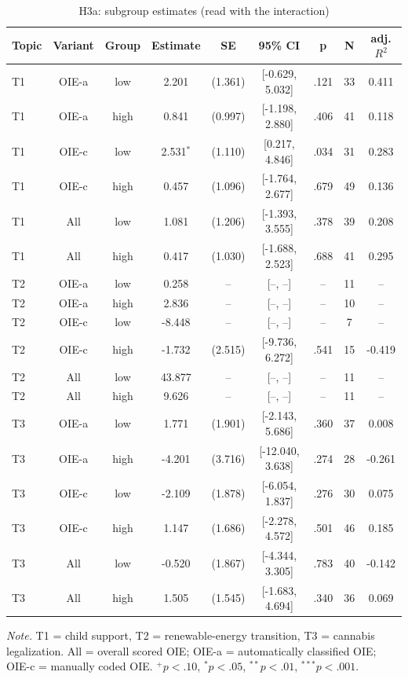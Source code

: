 \begin{table}[htbp]
\centering
\begin{threeparttable}
\caption{H3a: subgroup estimates (read with the interaction)}
\label{tab:tab_h3a_subgroups}
\begin{tabular}{lcccccccc}
\toprule
  Topic & Variant & Group & Estimate & SE & 95\% CI & p & N & adj. $R^2$ \\
\midrule
  T1 & OIE-a & low & 2.201 & (1.361) & [-0.629, 5.032] & .121 & 33 & 0.411 \\
  T1 & OIE-a & high & 0.841 & (0.997) & [-1.198, 2.880] & .406 & 41 & 0.118 \\
  T1 & OIE-c & low & 2.531$^{*}$ & (1.110) & [0.217, 4.846] & .034 & 31 & 0.283 \\
  T1 & OIE-c & high & 0.457 & (1.096) & [-1.764, 2.677] & .679 & 49 & 0.136 \\
  T1 & All & low & 1.081 & (1.206) & [-1.393, 3.555] & .378 & 39 & 0.208 \\
  T1 & All & high & 0.417 & (1.030) & [-1.688, 2.523] & .688 & 41 & 0.295 \\
  T2 & OIE-a & low & 0.258 & -- & [--, --] & -- & 11 & -- \\
  T2 & OIE-a & high & 2.836 & -- & [--, --] & -- & 10 & -- \\
  T2 & OIE-c & low & -8.448 & -- & [--, --] & -- & 7 & -- \\
  T2 & OIE-c & high & -1.732 & (2.515) & [-9.736, 6.272] & .541 & 15 & -0.419 \\
  T2 & All & low & 43.877 & -- & [--, --] & -- & 11 & -- \\
  T2 & All & high & 9.626 & -- & [--, --] & -- & 11 & -- \\
  T3 & OIE-a & low & 1.771 & (1.901) & [-2.143, 5.686] & .360 & 37 & 0.008 \\
  T3 & OIE-a & high & -4.201 & (3.716) & [-12.040, 3.638] & .274 & 28 & -0.261 \\
  T3 & OIE-c & low & -2.109 & (1.878) & [-6.054, 1.837] & .276 & 30 & 0.075 \\
  T3 & OIE-c & high & 1.147 & (1.686) & [-2.278, 4.572] & .501 & 46 & 0.185 \\
  T3 & All & low & -0.520 & (1.867) & [-4.344, 3.305] & .783 & 40 & -0.142 \\
  T3 & All & high & 1.505 & (1.545) & [-1.683, 4.694] & .340 & 36 & 0.069 \\
\bottomrule
\end{tabular}
\begin{tablenotes}\footnotesize\item \textit{Note.} T1 = child support, T2 = renewable-energy transition, T3 = cannabis legalization. All = overall scored OIE; OIE-a = automatically classified OIE; OIE-c = manually coded OIE. $^{+}p<.10$, $^{*}p<.05$, $^{**}p<.01$, $^{***}p<.001$.\end{tablenotes}
\end{threeparttable}
\end{table}
